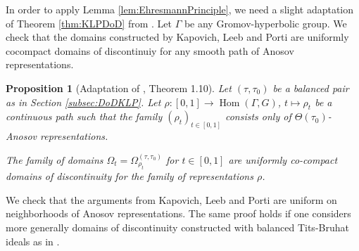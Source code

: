 \documentclass[reqno,10pt]{amsart}
\theoremstyle{plain}
\newtheorem{prop}[thm]{Proposition}
\theoremstyle{definition}
\theoremstyle{remark}
\newcommand{\type}{\tau}
\newcommand{\typeS}{{\tau_0}}
\DeclareMathOperator{\Hom}{Hom}
\begin{document}
In order to apply Lemma \ref{lem:EhresmannPrinciple}, we need a slight adaptation of Theorem \ref{thm:KLPDoD} from \cite{KLP-DoD}. Let $\Gamma$ be any Gromov-hyperbolic group. We check that the domains constructed by Kapovich, Leeb and Porti are uniformly cocompact domains of discontinuiy for any smooth path of Anosov representations.

\begin{prop}[{Adaptation of {\cite{KLP-DoD}, Theorem 1.10}}]
\label{prop:DoDUniform}
Let $(\type,\type_0)$ be a balanced pair as in Section \ref{subsec:DoDKLP}. Let $\rho:[0,1]\to \Hom(\Gamma,G)$, $t\mapsto \rho_t$ be a continuous path such that the family $(\rho_t)_{t\in [0,1]}$ consists only of $\Theta(\typeS)$-Anosov representations.

The family of domains $\Omega_t=\Omega_{\rho_t}^{(\type,\typeS)}$ for $t\in [0,1]$ are uniformly co-compact domains of discontinuity for the family of representations $\rho$.
\end{prop}

We check that the arguments from Kapovich, Leeb and Porti are uniform on neighborhoods of Anosov representations. The same proof holds if one considers more generally domains of discontinuity constructed with balanced Tits-Bruhat ideals as in \cite{KLP-DoD}.

\medskip
\end{document}
